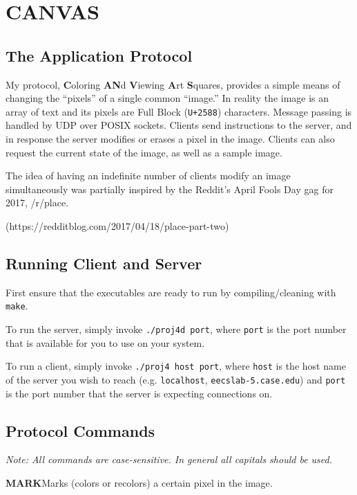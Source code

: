 \documentclass[letterpaper]{article}
\begin{document}
\section*{CANVAS}


\subsection*{The Application Protocol}

My protocol, \textbf{C}oloring \textbf{AN}d \textbf{V}iewing \textbf{A}rt
\textbf{S}quares, provides a simple means of changing the ``pixels'' of a
single common ``image.'' In reality the image is an array of text and its
pixels are Full Block (\texttt{U+2588}) characters. Message passing is handled
by UDP over POSIX sockets. Clients send instructions to the server, and in
response the server modifies or erases a pixel in the image. Clients can
also request the current state of the image, as well as a sample image.

The idea of having an indefinite number of clients modify an image
simultaneously was partially inspired by the Reddit's April Fools Day gag for
2017, /r/place.

(https://redditblog.com/2017/04/18/place-part-two)

\subsection*{Running Client and Server}

First ensure that the executables are ready to run by compiling/cleaning
with \texttt{make}.

To run the server, simply invoke \texttt{./proj4d port}, where \texttt{port} is
the port number that is available for you to use on your system.

To run a client, simply invoke \texttt{./proj4 host port}, where \texttt{host}
is the host name of the server you wish to reach (e.g.
\texttt{localhost}, \texttt{eecslab-5.case.edu}) and \texttt{port} is the port
number that the server is expecting connections on.

\subsection*{Protocol Commands}

\textit{Note: All commands are case-sensitive. In general all capitals should be used.}

\textbf{MARK}\quad Marks (colors or recolors) a certain pixel in the image. 
\end{document}
